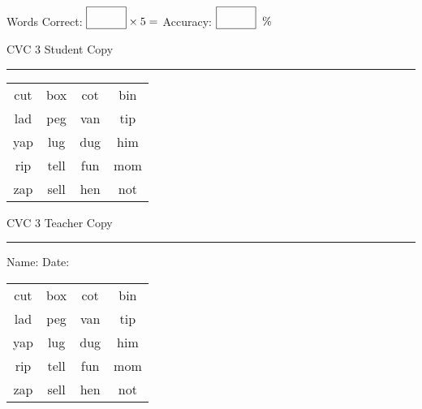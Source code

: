 \documentclass{memoir}
\begin{document}
\small

Words Correct: $\fbox{\phantom{\huge 100}} \times 5 = $ Accuracy: $\fbox{\phantom{\huge 100}}\;\; \%$ 

\vfill

\newpage


\footnotesize \noindent
CVC 3 \hfill Student Copy
\smallskip
\hrule

\Large

\setlength{\tabcolsep}{14pt}
\def\arraystretch{2}

{\selectfont


\begin{vplace}[0.5]
\begin{center}
\begin{tabular}{cccc}
cut & box & cot & bin \\
lad & peg & van & tip \\
yap & lug & dug & him \\
rip & tell & fun & mom \\
zap & sell & hen & not \\
\end{tabular}
\end{center}
\end{vplace}

}

\newpage

\footnotesize \noindent
CVC 3 \hfill Teacher Copy
\smallskip
\hrule

\small

\vfill

\noindent
Name: \underline{\hspace{1.75in}} \hfill Date: \underline{\hspace{1in}}

\Large

{\selectfont


\begin{vplace}[0.5]
\begin{center}
\begin{tabular}{cccc}
cut & box & cot & bin \\
lad & peg & van & tip \\
yap & lug & dug & him \\
rip & tell & fun & mom \\
zap & sell & hen & not \\
\end{tabular}
\end{center}
\end{vplace}



}
\end{document}
